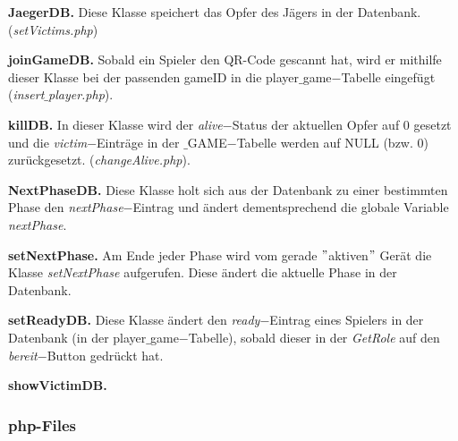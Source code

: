 \documentclass[12pt, a4paper]{article}
\begin{document}
\vspace{0,3 cm}
	
\textbf{JaegerDB.}
Diese Klasse speichert das Opfer des Jägers in der Datenbank. (\textit{setVictims.php})

\vspace{0,3 cm}

\textbf{joinGameDB.}
Sobald ein Spieler den QR-Code gescannt hat, wird er mithilfe dieser Klasse bei der passenden gameID in die player$\_$game$-$Tabelle eingefügt (\textit{insert}$\_$\textit{player.php}).

\vspace{0,3 cm}

\textbf{killDB.}
In dieser Klasse wird der \textit{alive}$-$Status der aktuellen Opfer auf 0 gesetzt und die \textit{victim}$-$Einträge in der $\_$GAME$-$Tabelle werden auf NULL (bzw. 0) zurückgesetzt. (\textit{changeAlive.php}).

\vspace{0,3 cm}
	
\textbf{NextPhaseDB.}
Diese Klasse holt sich aus der Datenbank zu einer bestimmten Phase den \textit{nextPhase}$-$Eintrag und ändert dementsprechend die globale Variable \textit{nextPhase}.

\vspace{0,3 cm}

\textbf{setNextPhase.}
Am Ende jeder Phase wird vom gerade $"$aktiven$"$ Gerät die Klasse \textit{setNextPhase} aufgerufen. Diese ändert die aktuelle Phase in der Datenbank.

\vspace{0,3 cm}

\textbf{setReadyDB.}
Diese Klasse ändert den \textit{ready}$-$Eintrag eines Spielers in der Datenbank (in der player$\_$game$-$Tabelle), sobald dieser in der \textit{GetRole} auf den \textit{bereit}$-$Button gedrückt hat.
	
\vspace{0,3 cm}	
	
\textbf{showVictimDB.}


		\subsubsection{php-Files}
		
\end{document}
